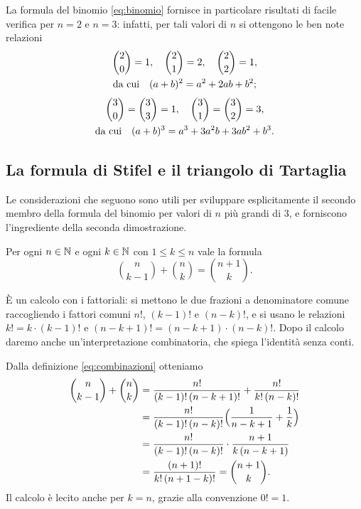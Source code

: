 La formula del binomio \eqref{eq:binomio} fornisce in particolare risultati di facile
verifica per $n=2$ e $n=3$: infatti, per tali valori di $n$ si ottengono le ben note
relazioni
\begin{gather}
  \binom20=1,\quad \binom21=2,\quad \binom22=1, \notag\\
  \text{da cui}\quad (a+b)^{2}=a^{2}+2ab+b^{2};\\[3pt]
  \binom30=\binom33=1,\quad \binom31=\binom32=3, \notag\\
  \text{da cui}\quad (a+b)^{3}=a^{3}+3a^{2}b+3ab^{2}+b^{3}.
\end{gather}

\subsection{La formula di Stifel e il triangolo di Tartaglia}

Le considerazioni che seguono sono utili per sviluppare esplicitamente il secondo
membro della formula del binomio per valori di $n$ più grandi di $3$, e forniscono
l'ingrediente della seconda dimostrazione.

\begin{lemma}\label{lem:stifel}
Per ogni $n\in\mathbb{N}$ e ogni $k\in\mathbb{N}$ con $1\le k\le n$ vale la formula
\begin{equation}\label{eq:stifel}
  \binom{n}{k-1}+\binom nk=\binom{n+1}{k}.
\end{equation}
\end{lemma}

\begin{schema}
\end{schema}

\begin{strategia}
È un calcolo con i fattoriali: si mettono le due frazioni a denominatore comune
raccogliendo i fattori comuni $n!$, $(k-1)!$ e $(n-k)!$, e si usano le relazioni
$k!=k\cdot(k-1)!$ e $(n-k+1)!=(n-k+1)\cdot(n-k)!$. Dopo il calcolo daremo anche
un'interpretazione combinatoria, che spiega l'identità senza conti.
\end{strategia}

\begin{dimostrazione}
Dalla definizione \eqref{eq:combinazioni} otteniamo
\begin{equation}\label{eq:stifel-calcolo}
\begin{split}
  \binom{n}{k-1}+\binom nk
  &=\frac{n!}{(k-1)!\,(n-k+1)!}+\frac{n!}{k!\,(n-k)!}\\
  &=\frac{n!}{(k-1)!\,(n-k)!}\Bigl(\frac{1}{n-k+1}+\frac1k\Bigr)\\
  &=\frac{n!}{(k-1)!\,(n-k)!}\cdot\frac{n+1}{k\,(n-k+1)}\\
  &=\frac{(n+1)!}{k!\,(n+1-k)!}=\binom{n+1}{k}.
\end{split}
\end{equation}
Il calcolo è lecito anche per $k=n$, grazie alla convenzione $0!=1$.
\end{dimostrazione}

